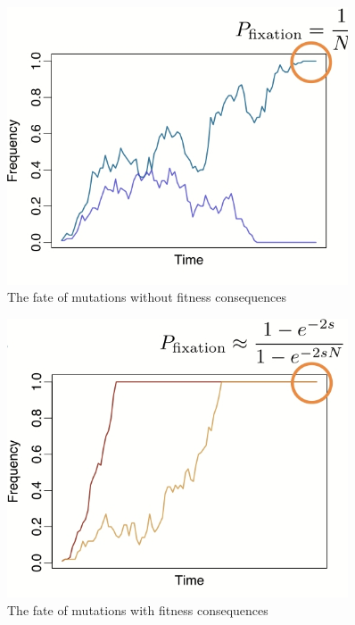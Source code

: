 \documentclass[]{article}
\begin{document}
\begin{figure}[H]
	\caption{The fate of mutations without fitness
		consequences}\label{fig:Neutral}
	\includegraphics[width=0.9\textwidth]{Neutral}
\end{figure}

\begin{figure}[H]
	\caption{The fate of mutations with fitness
		consequences}\label{fig:Selection}
	\includegraphics[width=0.9\textwidth]{Selection}
\end{figure}
\end{document}
